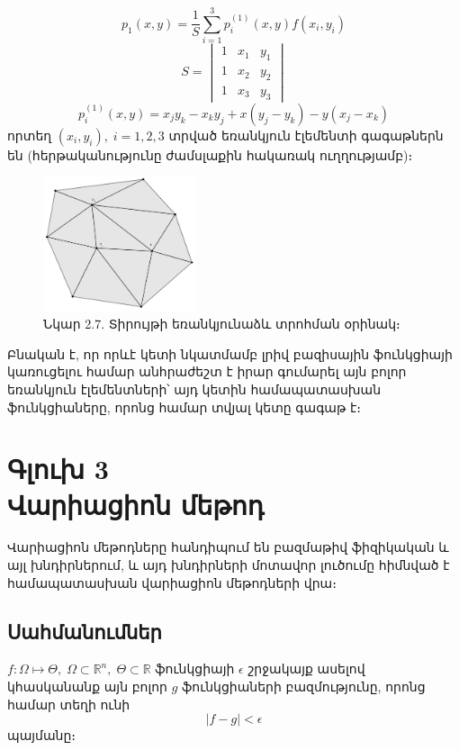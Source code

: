 \documentclass[fleqn, bachelor,subf,12pt,notitlepage]{article}
\begin{document}
\begin{equation}
p_{1}(x, y) = \dfrac{1}{S}\sum_{i=1}^{3} p^{(1)}_{i}(x,y)f(x_{i}, y_{i})
\end{equation}
$$S = \begin{vmatrix}
     1 & x_1 & y_1\\ 
     1 & x_2 & y_2\\
     1 & x_3 & y_3 
\end{vmatrix}$$
\begin{equation}
p^{(1)}_{i}(x,y) = x_{j}y_{k}-x_{k}y_{j}+x(y_{j}-y_{k})-y(x_{j}-x_{k})
\end{equation}
\noindent որտեղ $(x_{i}, y_{i}), \; i=1, 2, 3$ տրված եռանկյուն էլեմենտի գագաթներն են (հերթականությունը ժամսլաքին հակառակ ուղղությամբ)։

\begin{figure}[h!]
\centering
\includegraphics[width=0.4\textwidth]{images/two_var_triangular}
\captionsetup{labelformat=empty}
\caption{\hfill Նկար 2.7. Տիրույթի եռանկյունաձև տրոհման օրինակ։}
\end{figure}

Բնական է, որ որևէ կետի նկատմամբ լրիվ բազիսային ֆունկցիայի կառուցելու համար անհրաժեշտ է իրար գումարել այն բոլոր եռանկյուն էլեմենտների՝ այդ կետին համապատասխան ֆունկցիաները, որոնց համար տվյալ կետը գագաթ է։
\newpage
\section*{\centering Գլուխ 3 \\ Վարիացիոն մեթոդ}

Վարիացիոն մեթոդները հանդիպում են բազմաթիվ ֆիզիկական և այլ խնդիրներում, և այդ խնդիրների մոտավոր լուծումը հիմնված է համապատասխան վարիացիոն մեթոդների վրա։

\subsection*{Սահմանումներ}
$f : \Omega \mapsto \Theta, \; \Omega \subset \mathbb{R}^{n}, \; \Theta \subset \mathbb{R}$ ֆունկցիայի $\epsilon$ շրջակայք ասելով կհասկանանք այն բոլոր $g$ ֆունկցիաների բազմությունը, որոնց համար տեղի ունի
$$ \left|f-g\right| < \epsilon$$
պայմանը։
\end{document}
